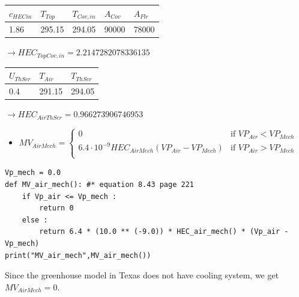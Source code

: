 \documentclass[a4paper]{article}
\numberwithin{equation}{section}
\begin{document}
\begin{table}[H]
\centering
\begin{tabular}{|l|l|l|l|l|}
\hline
\rowcolor[HTML]{FFFC9E}
\cellcolor[HTML]{FFFC9E}\textbf{$c_{HECin}$} &
\textbf{$T_{Top}$} & \textbf{$T_{Cov,in}$} &  \cellcolor[HTML]{FFFC9E}\textbf{$A_{Cov}$}& \cellcolor[HTML]{FFFC9E}\textbf{$A_{Flr}$}\\ \hline
1.86            & 295.15               &294.05             &90000      & 78000                \\ \hline
\end{tabular}
\end{table}
$\rightarrow HEC_{TopCov,in} = 2.2147282078336135$

\begin{table}[H]
\centering
\begin{tabular}{|l|l|l|}
\hline
\rowcolor[HTML]{FFFC9E}
\cellcolor[HTML]{FFFC9E}\textbf{$U_{ThScr}$} &
 \cellcolor[HTML]{FFFC9E}\textbf{$T_{Air}$}& \cellcolor[HTML]{FFFC9E}\textbf{$T_{ThScr}$}\\ \hline
0.4            & 291.15               &  294.05                        \\ \hline
\end{tabular}
\end{table}
$\rightarrow HEC_{AirThScr} = 0.966273906746953$

\begin{itemize}
    \item $ MV_{AirMech} = \begin{cases}
    0                                                     & \text{if~} VP_{Air} < VP_{Mech} \\
    6.4 \cdot 10^{-9} HEC_{AirMech}(VP_{Air} - VP_{Mech}) & \text{if~} VP_{Air} > VP_{Mech} \\
  \end{cases}  $
\end{itemize}
\begin{mdframed}[leftline=false,rightline=false,backgroundcolor=cyan!10]
  \begin{verbatim}
Vp_mech = 0.0
def MV_air_mech(): #* equation 8.43 page 221
    if Vp_air <= Vp_mech :
        return 0
    else :
        return 6.4 * (10.0 ** (-9.0)) * HEC_air_mech() * (Vp_air - Vp_mech)
print("MV_air_mech",MV_air_mech())
\end{verbatim}
\end{mdframed}
Since the greenhouse model in Texas does not have cooling system, we get $MV_{AirMech} = 0$.
\end{document}
